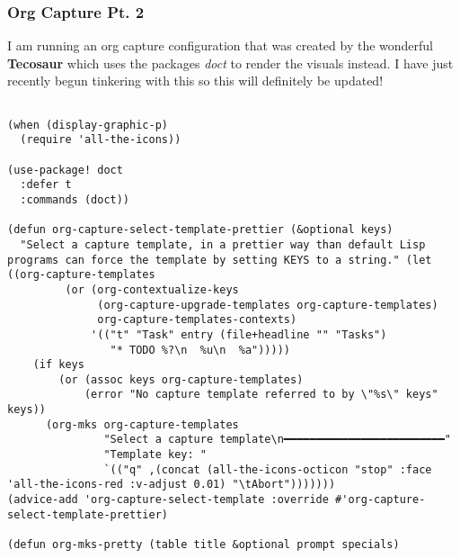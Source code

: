 \documentclass[11pt]{article}
\begin{document}
\subsubsection{Org Capture Pt. 2}
\label{sec:org91f5297}
I am running an org capture configuration that was created by the wonderful \textbf{Tecosaur} which uses the packages \emph{doct} to render the visuals instead. I have just recently begun tinkering with this so this will definitely be updated!
\begin{verbatim}

(when (display-graphic-p)
  (require 'all-the-icons))

(use-package! doct
  :defer t
  :commands (doct))

(defun org-capture-select-template-prettier (&optional keys)
  "Select a capture template, in a prettier way than default Lisp programs can force the template by setting KEYS to a string." (let ((org-capture-templates
         (or (org-contextualize-keys
              (org-capture-upgrade-templates org-capture-templates)
              org-capture-templates-contexts)
             '(("t" "Task" entry (file+headline "" "Tasks")
                "* TODO %?\n  %u\n  %a")))))
    (if keys
        (or (assoc keys org-capture-templates)
            (error "No capture template referred to by \"%s\" keys" keys))
      (org-mks org-capture-templates
               "Select a capture template\n━━━━━━━━━━━━━━━━━━━━━━━━━"
               "Template key: "
               `(("q" ,(concat (all-the-icons-octicon "stop" :face 'all-the-icons-red :v-adjust 0.01) "\tAbort")))))))
(advice-add 'org-capture-select-template :override #'org-capture-select-template-prettier)

(defun org-mks-pretty (table title &optional prompt specials)


\end{verbatim}
\end{document}
